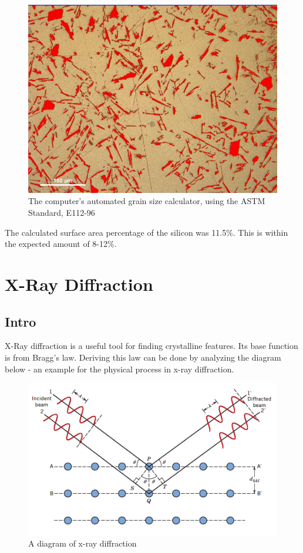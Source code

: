 \documentclass{article}
\begin{document}
\begin{figure}[h]
	\centering
	\includegraphics[scale=.2]{hyperu.png}
	\caption{The computer's automated grain size calculator, using the ASTM Standard, E112-96}
\end{figure}

The calculated surface area percentage of the silicon was 11.5\%. This is within the expected amount of 8-12\%.

\section{X-Ray Diffraction}

\subsection{Intro}

X-Ray diffraction is a useful tool for finding crystalline features. Its base function is from Bragg's law. Deriving this law can be done by analyzing the diagram below - an example for the physical process in x-ray diffraction.

\begin{figure}[h]
	\centering
	\includegraphics[scale=.4]{bragg.png}
	\caption{A diagram of x-ray diffraction}
\end{figure}
\end{document}

